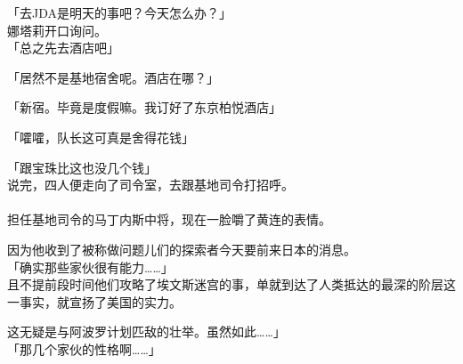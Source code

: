 「去JDA是明天的事吧？今天怎么办？」\\

娜塔莉开口询问。\\

「总之先去酒店吧」

「居然不是基地宿舍呢。酒店在哪？」

「新宿。毕竟是度假嘛。我订好了东京柏悦酒店」

「嚯嚯，队长这可真是舍得花钱」

「跟宝珠比这也没几个钱」\\

说完，四人便走向了司令室，去跟基地司令打招呼。\\

\sqsplit\\

担任基地司令的马丁内斯中将，现在一脸嚼了黄连的表情。

因为他收到了被称做问题儿们的探索者今天要前来日本的消息。\\

「确实那些家伙很有能力……」\\

且不提前段时间他们攻略了埃文斯迷宫的事，单就到达了人类抵达的最深的阶层这一事实，就宣扬了美国的实力。

这无疑是与阿波罗计划匹敌的壮举。虽然如此……」\\

「那几个家伙的性格啊……」\\

